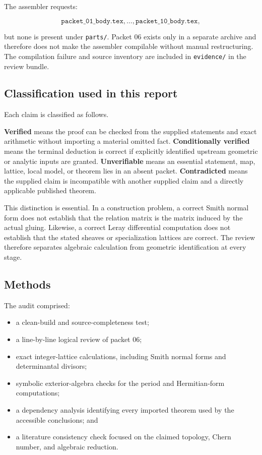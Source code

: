 \documentclass[
  10pt,
]{article}
\providecommand{\tightlist}{%
  \setlength{\itemsep}{0pt}\setlength{\parskip}{0pt}}
\begin{document}
The assembler requests:

\[
\texttt{packet\_01\_body.tex},\ldots,\texttt{packet\_10\_body.tex},
\]

but none is present under \texttt{parts/}. Packet 06 exists only in a
separate archive and therefore does not make the assembler compilable
without manual restructuring. The compilation failure and source
inventory are included in \texttt{evidence/} in the review bundle.

\subsection{Classification used in this
report}\label{classification-used-in-this-report}

Each claim is classified as follows.

\textbf{Verified} means the proof can be checked from the supplied
statements and exact arithmetic without importing a material omitted
fact. \textbf{Conditionally verified} means the terminal deduction is
correct if explicitly identified upstream geometric or analytic inputs
are granted. \textbf{Unverifiable} means an essential statement, map,
lattice, local model, or theorem lies in an absent packet.
\textbf{Contradicted} means the supplied claim is incompatible with
another supplied claim and a directly applicable published theorem.

This distinction is essential. In a construction problem, a correct
Smith normal form does not establish that the relation matrix is the
matrix induced by the actual gluing. Likewise, a correct Leray
differential computation does not establish that the stated sheaves or
specialization lattices are correct. The review therefore separates
algebraic calculation from geometric identification at every stage.

\subsection{Methods}\label{methods}

The audit comprised:

\begin{itemize}
\tightlist
\item
  a clean-build and source-completeness test;
\item
  a line-by-line logical review of packet 06;
\item
  exact integer-lattice calculations, including Smith normal forms and
  determinantal divisors;
\item
  symbolic exterior-algebra checks for the period and Hermitian-form
  computations;
\item
  a dependency analysis identifying every imported theorem used by the
  accessible conclusions; and
\item
  a literature consistency check focused on the claimed topology, Chern
  number, and algebraic reduction.
\end{itemize}
\end{document}

